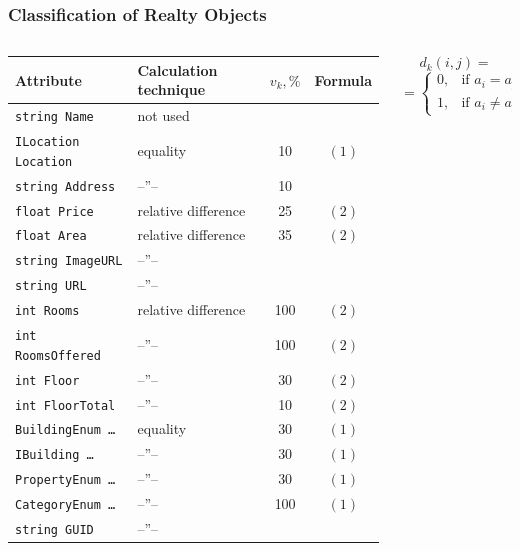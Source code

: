 \documentclass[10pt,dvipsnames]{beamer}
\begin{document}
\begin{frame}
  \frametitle{Classification of Realty Objects}

 \begin{columns}
    \begin{column}{0.8\linewidth}
\begin{table}[tb]
  \footnotesize
  \centering
  \begin{tabular}{|l|l|c|c|}
    \hline
    Attribute & Calculation technique & $v_k, \%$ & Formula \\
    \hline
\texttt{string Name} & not used & & \\
    \texttt{ILocation Location} & equality & 10 & $(1)$
    \\
\texttt{string Address} & --''-- & 10 & \\
\texttt{float Price} & relative difference & 25 & $(2)$\\
\texttt{float Area} & relative difference  & 35 & $(2)$\\
\texttt{string ImageURL} & --''-- & & \\
\texttt{string URL} & --''-- & & \\
\texttt{int Rooms}  & relative difference  & 100 & $(2)$\\
\texttt{int RoomsOffered} &  --''--   & 100 & $(2)$\\
\texttt{int Floor}  &  --''--   & 30 & $(2)$\\
\texttt{int FloorTotal}  &  --''--   & 10 & $(2)$\\
\texttt{BuildingEnum \ldots}  & equality & 30 & $(1)$\\
\texttt{IBuilding \ldots{}}  & --''-- & 30 &  $(1)$\\
\texttt{PropertyEnum \ldots} & --''-- & 30 &  $(1)$\\
\texttt{CategoryEnum \ldots} & --''-- & 100 &  $(1)$\\
    \texttt{string GUID} & --''-- & & \\
    \hline
  \end{tabular}
  \end{table}
 \end{column}
\begin{column}{0.2\linewidth}\footnotesize
\[
  d_k(i,j) =
\]
\[
 =\left\{
                                                          \begin{array}{ll}
                                                            0, & \mbox{if\ \ } a_i=a_j,\\
                                                            1, & \mbox{if\ \ } a_i\neq a_j,

\end{array}\]
\end{column}
\end{columns}
\end{frame}
\end{document}

